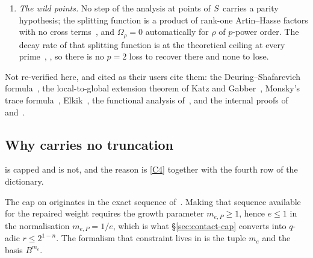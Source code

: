 \begin{enumerate}[label=\textup{(C\arabic*)},leftmargin=*,itemsep=3pt]
  \cite[Definition 7.3(1)]{kramermillerupton2021newton}, is supplied by the margin
  $[kp - k(p-1)]/\deltaP = k/\deltaP$, which is independent of $p$. The
  factor $p-1$ that vanishes at $p = 2$ is not the source of that
  strictness. Likewise the gain $\pi_s^{n(p-1)}$ normalises to slope $n/s$
  at every $p$ because $\vp(\pi) = 1/(p-1)$, so the $p-1$ cancels exactly.
  The only additive tightness anywhere in the local estimate is $\dfct(6) =
  1$, exactly at the threshold and exactly sufficient.
\item\label{C6} \emph{The wild points.} No step of the analysis at points of
  $S$ carries a parity hypothesis; the splitting function is a product
  of rank-one Artin--Hasse factors with no cross
  terms~\cite[Proposition 5.5]{kramermiller2020abelian}, and
  $\Omega_\rho = 0$ automatically for $\rho$ of $p$-power order. The decay
  rate of that splitting function is at the theoretical ceiling at every
  prime~\cite[Theorems 12.6.4 and 19.4.1]{kedlaya2010padic},
  \cite[Proposition 2.12]{pulita2007rank}, so there is no $p = 2$ loss to
  recover there and none to lose.
\end{enumerate}

Not re-verified here, and cited as their users cite them: the
Deuring--Shafarevich formula~\cite{crew1984etale}, the
local-to-global extension theorem of Katz and
Gabber~\cite{katz1986localtoglobal}, Monsky's trace
formula~\cite{monsky1971formal,monskywashnitzer1968formal},
Elkik~\cite{elkik1973solutions}, the functional analysis
of~\cite[\S6]{kramermiller2020abelian}, and the internal proofs
of~\cite{kedlayalittwitaszek2020tame} and~\cite{sugiyamayasuda2020belyi}.

\subsection{Why \texorpdfstring{}{the main theorem} carries no truncation}
\label{sec:no-cap}

 is capped and  is not, and the reason is
\ref{C4} together with the fourth row of the dictionary.

The cap on  originates in the exact sequence of~\cite[\S6.2]{kramermillerupton2021newton}. Making that sequence available for the
repaired weight requires the growth parameter $m_{e,P} \ge 1$, hence $e \le
1$ in the normalisation $m_{e,P} = 1/e$, which is what
\S\ref{sec:contact-cap} converts into $q$-adic $r \le 2^{1-n}$. The
formalism that constraint lives in is the tuple $m_e$ and the basis
$B^{m_e}$.


